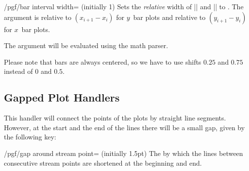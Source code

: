 \label{key-bar-interval-width}%
\begin{key}{/pgf/bar interval width= (initially 1)}
  Sets the \emph{relative} width of |\pgfplothandlerxbarinterval| and
  |\pgfplothandlerybarinterval| to . The argument is
  relative to $(x_{i+1} - x_i)$ for $y$~bar plots and relative to
  $(y_{i+1}-y_i)$ for $x$~bar plots. 
	
  The argument  will be evaluated using the math parser.
\begin{codeexample}[]
\end{codeexample}
  Please note that bars are always centered, so we have to use shifts
  $0.25$ and $0.75$ instead of $0$ and $0.5$. 
\end{key}

\subsection{Gapped Plot Handlers}

\label{section-plot-gapped}


\begin{command}{\pgfplothandlergaplineto}
  This handler will connect the points of the plots by straight line
  segments. However, at the start and the end of the lines there will
  be a small gap, given by the following key:
  \begin{key}{/pgf/gap around stream point= (initially 1.5pt)}
    The  by which the lines between consecutive stream
    points are shortened at the beginning and end.
  \end{key}
\begin{codeexample}[]
\end{codeexample}
\end{command}


